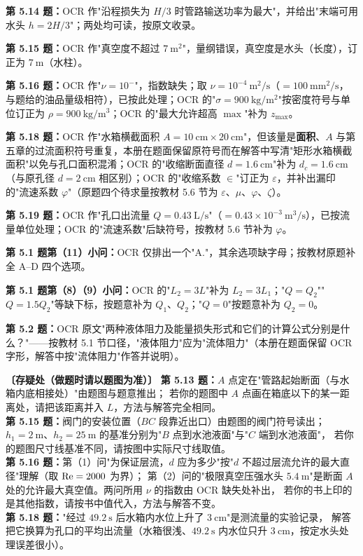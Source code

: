 \begin{tishi}
\begin{xiaowen}
\item \textbf{第 5.14 题：}OCR 作"沿程损失为 $H/3$ 时管路输送功率为最大"，并给出"末端可用水头 $h=2H/3$"；两处均可读，按原文收录。
\item \textbf{第 5.15 题：}OCR 作"真空度不超过 $7\ \mathrm{m^2}$"，量纲错误，真空度是水头（长度），订正为 $7\ \mathrm{m}$（水柱）。
\item \textbf{第 5.16 题：}OCR 作"$\nu=10^{-}$"，指数缺失；取 $\nu=10^{-4}\ \mathrm{m^2/s}$（$=100\ \mathrm{mm^2/s}$，与题给的油品量级相符），已按此处理；OCR 的"$\sigma=900\ \mathrm{kg/m^2}$"按密度符号与单位订正为 $\rho=900\ \mathrm{kg/m^3}$；OCR 的"最大允许超高 $\max$"补为 $z_{\max}$。
\item \textbf{第 5.18 题：}OCR 作"水箱横截面积 $A=10\ \mathrm{cm}\times20\ \mathrm{cm}$"，但该量是\textbf{面积}、$A$ 与第五章的过流面积符号重复，本册在题面保留原符号而在解答中写清"矩形水箱横截面积"以免与孔口面积混淆；OCR 的"收缩断面直径 $d=1.6\ \mathrm{cm}$"补为 $d_c=1.6\ \mathrm{cm}$（与原孔径 $d=2\ \mathrm{cm}$ 相区别）；OCR 的"收缩系数 $\in$"订正为 $\varepsilon$，并补出漏印的"流速系数 $\varphi$"（原题四个待求量按教材 5.6 节为 $\varepsilon$、$\mu$、$\varphi$、$\zeta$）。
\item \textbf{第 5.19 题：}OCR 作"孔口出流量 $Q=0.43\ \mathrm{L/s}$"（$=0.43\times10^{-3}\ \mathrm{m^3/s}$），已按流量单位处理；OCR 的"流速系数"后缺符号，按教材 5.6 节补为 $\varphi$。
\item \textbf{第 5.1 题第（11）小问：}OCR 仅排出一个"A."，其余选项缺字母；按教材原题补全 A--D 四个选项。
\item \textbf{第 5.1 题第（8）（9）小问：}OCR 的"$L_2=3L$"补为 $L_2=3L_1$；"$Q=Q_2$""$Q=1.5Q_2$"等缺下标，按题意补为 $Q_1$、$Q_2$；"$Q=0$"按题意补为 $Q_2=0$。
\item \textbf{第 5.2 题：}OCR 原文"两种液体阻力及能量损失形式和它们的计算公式分别是什么？"——按教材 5.1 节口径，"液体阻力"应为"流体阻力"（本册在题面保留 OCR 字形，解答中按"流体阻力"作答并说明）。
\end{xiaowen}
\end{tishi}

\begin{tishi}
\textbf{〔存疑处（做题时请以题图为准）〕}
\textbf{第 5.13 题：}$A$ 点定在"管路起始断面（与水箱内底相接处）"由题图与题意推出；
若你的题图中 $A$ 点画在箱底以下的某一距离处，请把该距离并入 $L$，方法与解答完全相同。\\
\textbf{第 5.15 题：}阀门的安装位置（$BC$ 段靠近出口）由题图的阀门符号读出；
$h_1=2\ \mathrm{m}$、$h_2=25\ \mathrm{m}$ 的基准分别为"$B$ 点到水池液面"与"$C$ 端到水池液面"，
若你的题图尺寸线基准不同，请按图中实际尺寸线取值。\\
\textbf{第 5.16 题：}第（1）问"为保证层流，$d$ 应为多少"按"$d$ 不超过层流允许的最大直径"理解（取 $\mathrm{Re}=2000$ 为界）；
第（2）问的"极限真空压强水头 $5.4\ \mathrm{m}$"是断面 $A$ 处的允许最大真空值。两问所用 $\nu$ 的指数由 OCR 缺失处补出，
若你的书上印的是其他指数，请按书中值代入，方法与解答不变。\\
\textbf{第 5.18 题：}"经过 $49.2\ \mathrm{s}$ 后水箱内水位上升了 $3\ \mathrm{cm}$"是测流量的实验记录，
解答把它换算为孔口的平均出流量（水箱很浅、$49.2\ \mathrm{s}$ 内水位只升 $3\ \mathrm{cm}$，按定水头处理误差很小）。
\end{tishi}
